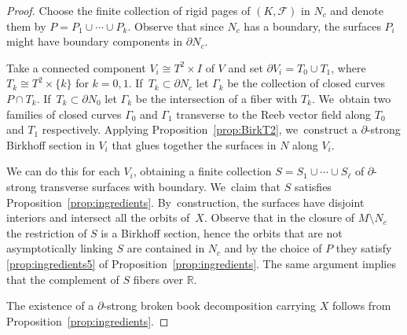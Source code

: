\begin{proof}
Choose the finite collection of rigid pages of $(K,\mathcal{F})$ in $N_c$ and denote them by $P=P_1\cup \cdots \cup P_k$. Observe that since $N_c$ has a boundary, the surfaces $P_i$ might have boundary components in $\partial N_c$.

Take a connected component $V_i\cong T^2\times I$ of $V$ and set $\partial V_i=T_0\cup T_1$, where $T_k\cong T^2\times \{k\}$ for $k=0,1$. If~$T_k \subset \partial N_c$ let $\Gamma_k$ be the collection of closed curves $P\cap T_k$. If~$T_k\subset \partial N_0$ let $\Gamma_k$ be the intersection of a fiber with $T_k$. We~obtain two families of closed curves $\Gamma_0$ and $\Gamma_1$ transverse to the Reeb vector field along $T_0$ and $T_1$ respectively. Applying Proposition~\ref{prop:BirkT2}, we~construct a $\partial$-strong Birkhoff section in $V_i$ that glues together the surfaces in $N$ along $V_i$.

We can do this for each $V_i$, obtaining a finite collection $S=S_1\cup\cdots \cup S_\ell$ of $\partial$\nobreakdash-strong transverse surfaces with boundary. We~claim that $S$ satisfies Proposition~\ref{prop:ingredients}. By~construction, the surfaces have disjoint interiors and intersect all the orbits of~$X$. Observe that in the closure of $M\setminus N_c$ the restriction of $S$ is a Birkhoff section, hence the orbits that are not asymptotically linking $S$ are contained in $N_c$ and by the choice of $P$ they satisfy \eqref{prop:ingredients5} of Proposition~\ref{prop:ingredients}. The same argument implies that the complement of $S$ fibers over $\mathbb{R}$.

The existence of a $\partial$-strong broken book decomposition carrying $X$ follows from Proposition~\ref{prop:ingredients}.


\end{proof}
